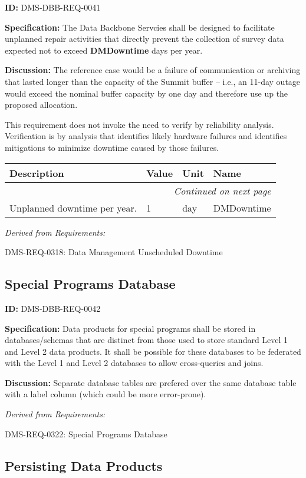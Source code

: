 \documentclass[SE,toc]{lsstdoc}
\makeatletter
\newcommand{\paramname}[1]{\hspace{0pt}#1}
\newcommand{\unitname}[1]{\hspace{0pt}#1}
\newenvironment{parameters}[0]{%
\setlength\LTleft{0pt}
\setlength\LTright{\fill}
\begin{small}
\begin{longtable}[]{|p{0.49\textwidth}|l|p{0.6in}|p{1.70in}@{}|}

\hline \textbf{Description} & \textbf{Value} & \textbf{Unit} & \textbf{Name} \\ \hline
\endhead

\hline \multicolumn{4}{r}{\emph{Continued on next page}} \\
\endfoot

\hline\hline
\endlastfoot
}{%
\hline
\end{longtable}
\end{small}
}
\makeatother
\begin{document}
\label{DMS-DBB-REQ-0041}
\textbf{ID:} DMS-DBB-REQ-0041

\textbf{Specification:}
The Data Backbone Servcies shall be designed to facilitate unplanned repair activities that directly prevent the collection of survey data expected not to exceed \textbf{DMDowntime} days per year.

\textbf{Discussion:}
The reference case would be a failure of communication or archiving that lasted longer than the capacity of the Summit buffer -- i.e., an 11-day outage would exceed the nominal buffer capacity by one day and therefore use up the proposed allocation.

This requirement does not invoke the need to verify by reliability analysis. Verification is by analysis that identifies likely hardware failures and identifies mitigations to minimize downtime caused by those failures.

\begin{parameters}
Unplanned downtime per year.
&
1
&
\unitname{%
day
}
&
\paramname{%
DMDowntime
} \\\hline
\end{parameters}

\emph{Derived from Requirements:}

DMS-REQ-0318:
Data Management Unscheduled Downtime \newline

\subsection{Special Programs Database}

\label{DMS-DBB-REQ-0042}
\textbf{ID:} DMS-DBB-REQ-0042

\textbf{Specification:}
Data products for special programs shall be stored in databases/schemas that are distinct from those used to store standard Level 1 and Level 2 data products. It shall be possible for these databases to be federated with the Level 1 and Level 2 databases to allow cross-queries and joins.

\textbf{Discussion:}
Separate database tables are prefered over the same database table with a label column (which could be more error-prone).

\emph{Derived from Requirements:}

DMS-REQ-0322:
Special Programs Database \newline

\subsection{Persisting Data Products}
\end{document}
